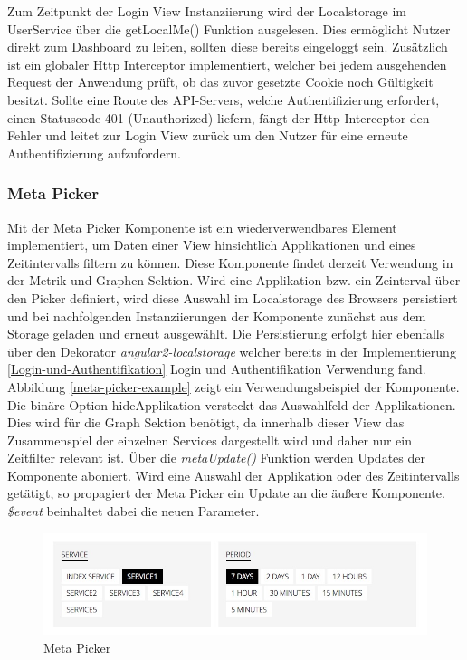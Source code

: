 Zum Zeitpunkt der Login View Instanziierung wird der Localstorage im UserService über die getLocalMe() Funktion ausgelesen.
Dies ermöglicht Nutzer direkt zum Dashboard zu leiten, sollten diese bereits eingeloggt sein.
Zusätzlich ist ein globaler Http Interceptor implementiert, welcher bei jedem ausgehenden Request der Anwendung prüft, ob das zuvor gesetzte Cookie noch Gültigkeit besitzt.
Sollte eine Route des \ac{API}-Servers, welche Authentifizierung erfordert, einen Statuscode 401 (Unauthorized) liefern,
fängt der Http Interceptor den Fehler und leitet zur Login View zurück um den Nutzer für eine erneute Authentifizierung aufzufordern.




\subsubsection{Meta Picker}

Mit der Meta Picker Komponente ist ein wiederverwendbares Element implementiert, um Daten einer View hinsichtlich Applikationen und eines Zeitintervalls filtern zu können.
Diese Komponente findet derzeit Verwendung in der Metrik und Graphen Sektion. Wird eine Applikation bzw. ein Zeinterval über den Picker definiert,
wird diese Auswahl im Localstorage des Browsers persistiert und bei nachfolgenden Instanziierungen der Komponente zunächst aus dem Storage geladen und erneut ausgewählt.
Die Persistierung erfolgt hier ebenfalls über den Dekorator \emph{angular2-localstorage}
welcher bereits in der Implementierung \ref{Login-und-Authentifikation} Login und Authentifikation Verwendung fand.
Abbildung \ref{meta-picker-example} zeigt ein Verwendungsbeispiel der Komponente.
Die binäre Option hideApplikation versteckt das Auswahlfeld der Applikationen. Dies wird für die Graph Sektion benötigt,
da innerhalb dieser View das Zusammenspiel der einzelnen Services dargestellt wird und daher nur ein Zeitfilter relevant ist.
Über die \emph{metaUpdate()} Funktion werden Updates der Komponente aboniert. Wird eine Auswahl der Applikation oder des Zeitintervalls getätigt,
so propagiert der Meta Picker ein Update an die äußere Komponente. \emph{\$event} beinhaltet dabei die neuen Parameter.





\begin{figure}[h]
 \centering
 \includegraphics[width=\linewidth]{kapitel4/metapicker.jpg}
 \caption{Meta Picker}
 \label{metapicker}
\end{figure}
\vspace{0.3cm}


